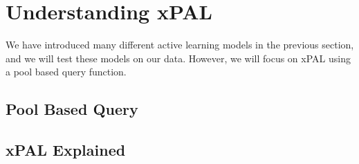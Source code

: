\chapter{Understanding xPAL}

We have introduced many different active learning models in the previous section, and we will test these models on our data. However, we will focus on xPAL using a pool based query function.

\section{Pool Based Query}

\section{xPAL Explained}


